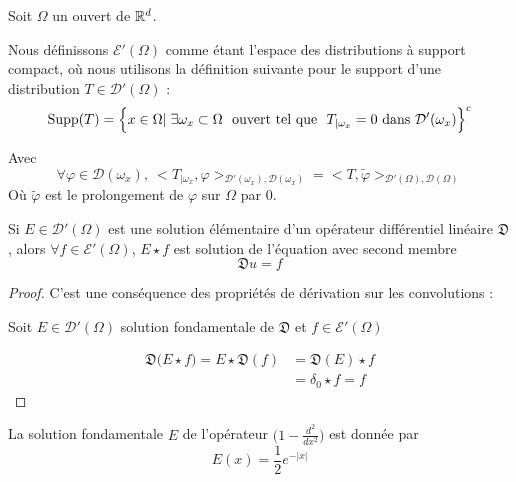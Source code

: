 \begin{definitionbox}
\begin{definition}
    Soit $\Omega$ un ouvert de $\mathbb{R}^d$.
    
    Nous définissons $\mathcal{E}'(\Omega)$ comme étant l'espace des distributions à support compact, où nous utilisons la définition suivante pour le support d'une distribution $T \in \mathcal{D}'(\Omega)$ :
    $$\text{Supp}(T) = \Bigl\{ x \in \Omega | \; \exists \omega_x \subset \Omega \ \ \text{ouvert}  \ \text{tel que} \ \ T_{|\omega_x} = 0 \ \text{dans} \ \mathcal{D}'(\omega_x) \Bigr\}^{c}$$

    Avec 
    $$\forall \varphi \in \mathcal{D}(\omega_x), \ \big<T_{|\omega_x},\varphi\big>_{\mathcal{D}'(\omega_x),\mathcal{D}(\omega_x)} = \big<T,\tilde{\varphi} \big>_{\mathcal{D}'(\Omega),\mathcal{D}(\Omega)}$$ 
    Où $\tilde{\varphi}$ est le prolongement de $\varphi$ sur $\Omega$ par 0.
    
\end{definition}
\end{definitionbox}

\begin{propositionbox}
\begin{proposition}
    Si $E \in \mathcal{D}'(\Omega)$ est une solution élémentaire d'un opérateur différentiel linéaire $\mathfrak{D}$,
    alors $\forall f \in \mathcal{E}'(\Omega)$, $E \star f$ est solution de l'équation avec second membre
    $$ \mathfrak{D}u = f $$
\end{proposition}
\end{propositionbox}

\begin{proof}
    C'est une conséquence des propriétés de dérivation sur les convolutions :
    
    \vspace{1em}
    Soit $E \in \mathcal{D}'(\Omega)$ solution fondamentale de $\mathfrak{D}$ et $f \in \mathcal{E}'(\Omega)$
    
    \begin{equation*}
    \begin{split}
        \mathfrak{D}\bigl( E \star f \bigr) = E \star \mathfrak{D}(f) &= \mathfrak{D}(E) \star f \\
        &= \delta_0 \star f = f
    \end{split}
    \end{equation*}
\end{proof}
\begin{lemmabox}
\begin{lemma}
    La solution fondamentale $E$ de l'opérateur $\bigl( 1 - \frac{d^2}{dx^2}\bigr) $ est donnée par
    $$E(x) = \frac{1}{2}e^{-|x|} $$
\end{lemma}
\end{lemmabox}

